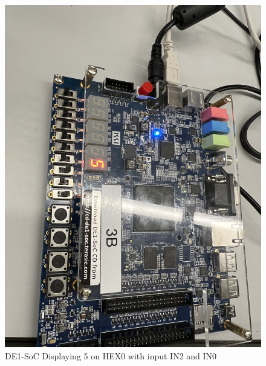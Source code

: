 \documentclass[
	letterpaper, %
	10pt, %
]{CSUniSchoolLabReport}
\begin{document}
\begin{figure}[H]
  \centering
  \includegraphics[width=.9\textwidth]{Figures/Disp_5.jpg}
  \caption{DE1-SoC Displaying 5 on HEX0 with input IN2 and IN0}
  \label{fig:8}
\end{figure}
\end{document}
